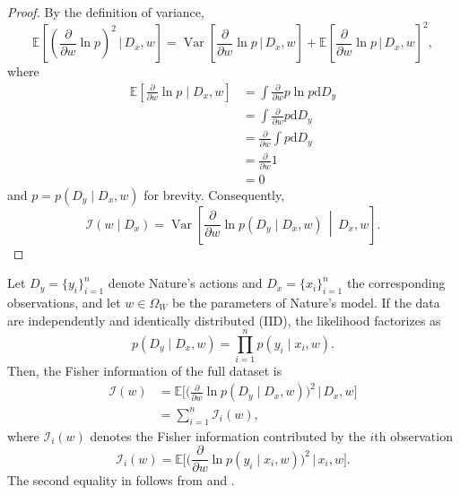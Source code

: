 \begin{proof}
	By the definition of variance,
	\begin{equation}
			\mathbb{E}\left[
			\left(
			\frac{\partial}{\partial w}
			\ln p
			\right)^2 \,\Bigg|\, D_x,w
			\right]
			=
			\operatorname{Var}\left[
			\frac{\partial}{\partial w}
			\ln p \,\Bigg|\, D_x,w
			\right]+
			\mathbb{E}\left[
			\frac{\partial}{\partial w}
			\ln p \,\Bigg|\, D_x,w
			\right]^2,
	\end{equation}
	where
	\begin{align}
		\mathbb{E}\left[\frac{\partial}{\partial w}\ln p \mid D_x,w\right]
		&=
		\int
		\frac{\partial}{\partial w}
		p\ln p
		 \mathrm{d}D_y
		\\
		&=
		\int
		\frac{\partial}{\partial w}
		p
		\mathrm{d}D_y\\ 
		&=
		\frac{\partial}{\partial w}
		\int
		p
		\mathrm{d}D_y\\
		&=
		\frac{\partial}{\partial w}1
		\\
		&=
		0
	\end{align}
	and $p=p(D_y\mid D_x,w)$ for brevity. Consequently,
	\begin{equation}
		\mathcal{I}(w \mid D_x)
		=
		\operatorname{Var}\left[
		\frac{\partial}{\partial w}
		\ln p(D_y \mid D_x,w)
		\,\middle|\,D_x,w
		\right].
	\end{equation}
\end{proof}


\begin{theorem}
	\label{thm:fisher_sample}
	Let $D_y = \{y_i\}_{i=1}^n$ denote Nature’s actions and $D_x = \{x_i\}_{i=1}^n$ the corresponding observations, and let $w \in \Omega_W$ be the parameters of Nature’s model. If the data are independently and identically distributed (IID), the likelihood factorizes as
	\begin{equation}
		p(D_y \mid D_x, w) = \prod_{i=1}^{n} p(y_i \mid x_i, w).
		\label{eq:fisher2}
	\end{equation}
	Then, the Fisher information of the full dataset is
	\begin{equation}
		\begin{split}
			\mathcal{I}(w) 
			&= \mathbb{E}\Bigg[\Bigg(\frac{\partial}{\partial w} \ln p(D_y \mid D_x, w)\Bigg)^2 \,\Bigg|\, D_x, w \Bigg] \\
			&= \sum_{i=1}^{n} \mathcal{I}_i(w),
		\end{split}
		\label{eq:fisher1}
	\end{equation}
	where $\mathcal{I}_i(w)$ denotes the Fisher information contributed by the $i$th observation
	\begin{equation}
		\mathcal{I}_i(w) = \mathbb{E}\Bigg[\Bigg(\frac{\partial}{\partial w} \ln p(y_i \mid x_i, w)\Bigg)^2 \,\Bigg|\, x_i, w\Bigg].
	\end{equation}
	The second equality in  follows from  and .
\end{theorem}

